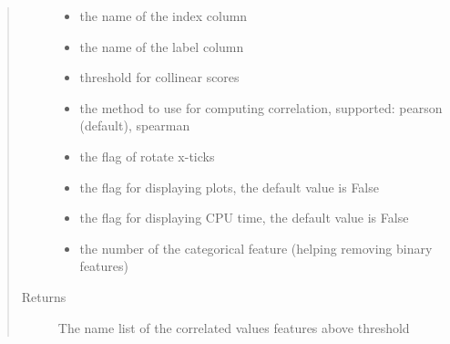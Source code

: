 \documentclass[letterpaper,11pt,english]{sphinxmanual}
\begin{document}
\begin{fulllineitems}
\begin{fulllineitems}
\begin{quote}
\begin{description}
\begin{itemize}
\item {} 
 \textendash{} the name of the index column

\item {} 
 \textendash{} the name of the label column

\item {} 
 \textendash{} threshold for collinear scores

\item {} 
 \textendash{} the method to use for computing correlation, supported: pearson (default), spearman

\item {} 
 \textendash{} the flag of rotate x-ticks

\item {} 
 \textendash{} the flag for displaying plots, the default value is False

\item {} 
 \textendash{} the flag for displaying CPU time, the default value is False

\item {} 
 \textendash{} the number of the categorical feature (helping removing binary features)

\end{itemize}

\item[{Returns}] \leavevmode
The name list of the correlated values features above threshold

\end{description}\end{quote}

\end{fulllineitems}



\end{fulllineitems}
\end{document}
